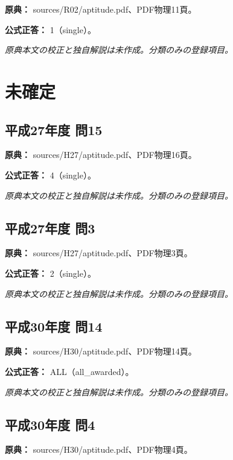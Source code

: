 \noindent\textbf{原典：} sources/R02/aptitude.pdf、PDF物理11頁。

\textbf{公式正答：} 1（single）。

\par\textit{原典本文の校正と独自解説は未作成。分類のみの登録項目。}

\section{未確定}

\subsection{平成27年度 問15}
\label{q:h27-reg-apt-15}

\noindent\textbf{原典：} sources/H27/aptitude.pdf、PDF物理16頁。

\textbf{公式正答：} 4（single）。

\par\textit{原典本文の校正と独自解説は未作成。分類のみの登録項目。}

\subsection{平成27年度 問3}
\label{q:h27-reg-apt-03}

\noindent\textbf{原典：} sources/H27/aptitude.pdf、PDF物理3頁。

\textbf{公式正答：} 2（single）。

\par\textit{原典本文の校正と独自解説は未作成。分類のみの登録項目。}

\subsection{平成30年度 問14}
\label{q:h30-reg-apt-14}

\noindent\textbf{原典：} sources/H30/aptitude.pdf、PDF物理14頁。

\textbf{公式正答：} ALL（all\_awarded）。

\par\textit{原典本文の校正と独自解説は未作成。分類のみの登録項目。}

\subsection{平成30年度 問4}
\label{q:h30-reg-apt-04}

\noindent\textbf{原典：} sources/H30/aptitude.pdf、PDF物理4頁。

